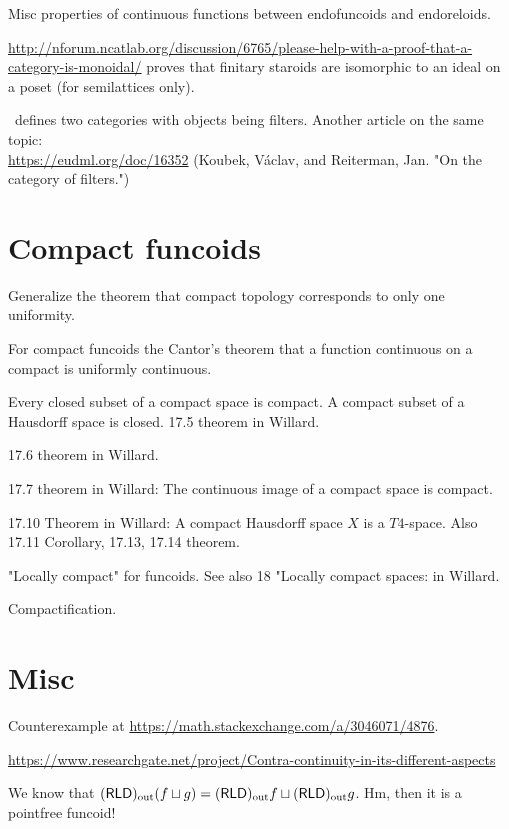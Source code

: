 \documentclass{amsart}
\begin{document}
Misc properties of continuous functions between endofuncoids and endoreloids.

\url{http://nforum.ncatlab.org/discussion/6765/please-help-with-a-proof-that-a-category-is-monoidal/} proves that
finitary staroids are isomorphic to an ideal on a poset (for semilattices only).

\cite{filt-cat}~defines two categories with objects being filters. Another article on the same topic:\\
\url{https://eudml.org/doc/16352} (Koubek, V\'aclav, and Reiterman, Jan. "On the category of filters.")


\section{Compact funcoids}

Generalize the theorem that compact topology corresponds to only one uniformity.

For compact funcoids the Cantor's theorem that a function continuous on a compact is uniformly continuous.

Every closed subset of a compact space is compact. A compact subset of a Hausdorff space is closed. 17.5 theorem in Willard.

17.6 theorem in Willard.

17.7 theorem in Willard: The continuous image of a compact space is compact.

17.10 Theorem in Willard: A compact Hausdorff space $X$ is a $T 4$-space. Also 17.11 Corollary, 17.13, 17.14 theorem.

"Locally compact" for funcoids. See also 18 "Locally compact spaces: in Willard.

Compactification.

\section{Misc}

Counterexample at \url{https://math.stackexchange.com/a/3046071/4876}.

\url{https://www.researchgate.net/project/Contra-continuity-in-its-different-aspects}

We know that $(\mathsf{RLD})_{\mathrm{out}}(f\sqcup g) = (\mathsf{RLD})_{\mathrm{out}} f\sqcup(\mathsf{RLD})_{\mathrm{out}} g$.
Hm, then it is a pointfree funcoid!
\end{document}
